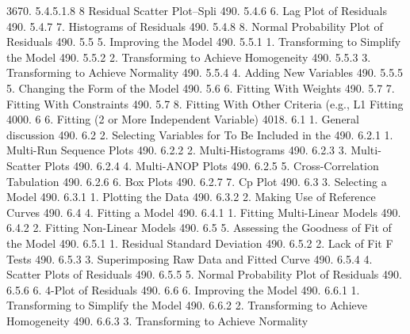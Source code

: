 3670.     5.4.5.1.8                               8  Residual Scatter Plot--Spli
490.      5.4.6                       6. Lag Plot of Residuals
490.      5.4.7                       7. Histograms of Residuals
490.      5.4.8                       8. Normal Probability Plot of Residuals
490.      5.5                   5. Improving the Model
490.      5.5.1                       1. Transforming to Simplify the Model
490.      5.5.2                       2. Transforming to Achieve Homogeneity
490.      5.5.3                       3. Transforming to Achieve Normality
490.      5.5.4                       4. Adding New Variables
490.      5.5.5                       5. Changing the Form of the Model
490.      5.6                   6. Fitting With Weights
490.      5.7                   7. Fitting With Constraints
490.      5.7                   8. Fitting With Other Criteria (e.g., L1 Fitting
4000.     6               6. Fitting (2 or More Independent Variable)
4018.     6.1                   1. General discussion
490.      6.2                   2. Selecting Variables for To Be Included in the
490.      6.2.1                       1. Multi-Run Sequence Plots
490.      6.2.2                       2. Multi-Histograms
490.      6.2.3                       3. Multi-Scatter Plots
490.      6.2.4                       4. Multi-ANOP Plots
490.      6.2.5                       5. Cross-Correlation Tabulation
490.      6.2.6                       6. Box Plots
490.      6.2.7                       7. Cp Plot
490.      6.3                   3. Selecting a Model
490.      6.3.1                       1. Plotting the Data
490.      6.3.2                       2. Making Use of Reference Curves
490.      6.4                   4. Fitting a Model
490.      6.4.1                       1. Fitting Multi-Linear Models
490.      6.4.2                       2. Fitting Non-Linear Models
490.      6.5                   5. Assessing the Goodness of Fit of the Model
490.      6.5.1                       1. Residual Standard Deviation
490.      6.5.2                       2. Lack of Fit F Tests
490.      6.5.3                       3. Superimposing Raw Data and Fitted Curve
490.      6.5.4                       4. Scatter Plots of Residuals
490.      6.5.5                       5. Normal Probability Plot of Residuals
490.      6.5.6                       6. 4-Plot of Residuals
490.      6.6                   6. Improving the Model
490.      6.6.1                       1. Transforming to Simplify the Model
490.      6.6.2                       2. Transforming to Achieve Homogeneity
490.      6.6.3                       3. Transforming to Achieve Normality
